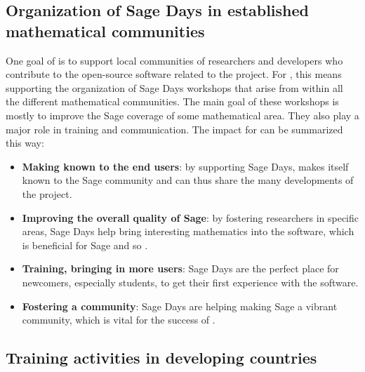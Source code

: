 \documentclass{deliverablereport}
\begin{document}











\subsection{Organization of Sage Days in established mathematical communities}

One goal of \ODK is to support local communities of researchers
and developers who contribute to the open-source software related to
the project. For \Sage, this means supporting the organization of Sage Days
workshops that arise from within all the different mathematical communities. The main 
goal of these workshops is mostly to improve the Sage coverage of some mathematical
area. They also play a major role in training and communication. The
impact for \ODK can be summarized this way:

\begin{itemize}
\item \textbf{Making \ODK known to the end users}: by supporting Sage Days,
\ODK makes itself known to the Sage community and can
thus share the many developments of the project.

\item \textbf{Improving the overall quality of Sage}: by fostering researchers
in specific areas, Sage Days help bring interesting mathematics into
the software, which is beneficial for Sage and so \ODK.

\item \textbf{Training, bringing in more users}: Sage Days are the perfect place
for newcomers, especially students, to get their first experience with the software.

\item \textbf{Fostering a community}: Sage Days are helping making Sage a vibrant
community, which is vital for the success of \ODK.
\end{itemize}



\subsection{Training activities in developing countries}
\end{document}
